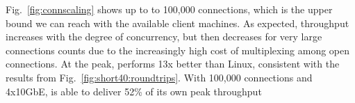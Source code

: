 
Fig.~\ref{fig:connscaling} shows up to to 100,000 connections, which
is the upper bound we can reach with the available client machines.
As expected, throughput increases with the degree of concurrency, but
then decreases for very large connections counts due to the
increasingly high cost of multiplexing among open connections.  At the
peak, \ix performs 13x better than Linux, consistent with the results
from Fig.~\ref{fig:short40:roundtrips}.  With 100,000 connections and
4x10GbE, \ix is able to deliver 52\% of its own peak
throughput


